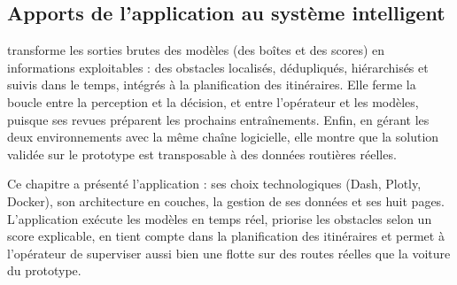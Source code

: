 \subsection{Apports de l'application au système intelligent}
\app{} transforme les sorties brutes des modèles (des boîtes et des scores) en informations exploitables : des
obstacles localisés, dédupliqués, hiérarchisés et suivis dans le temps, intégrés à la planification des itinéraires.
Elle ferme la boucle entre la perception et la décision, et entre l'opérateur et les modèles, puisque ses revues
préparent les prochains entraînements. Enfin, en gérant les deux environnements avec la même chaîne logicielle, elle
montre que la solution validée sur le prototype est transposable à des données routières réelles.

\chapconclusion
Ce chapitre a présenté l'application \app : ses choix technologiques (Dash, Plotly, Docker), son architecture en
couches, la gestion de ses données et ses huit pages. L'application exécute les modèles en temps réel, priorise les
obstacles selon un score explicable, en tient compte dans la planification des itinéraires et permet à l'opérateur de
superviser aussi bien une flotte sur des routes réelles que la voiture du prototype.
